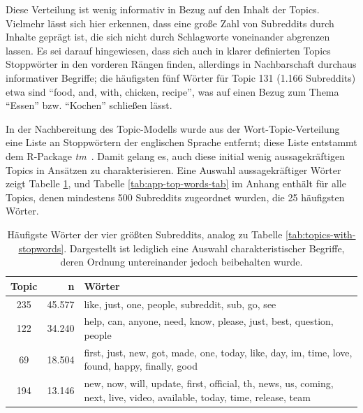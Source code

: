 \documentclass[11pt,a4paper,twoside]{article}
\begin{document}
Diese Verteilung ist wenig informativ in Bezug auf den Inhalt der
Topics. Vielmehr lässt sich hier erkennen, dass eine große Zahl von
Subreddits durch Inhalte geprägt ist, die sich nicht durch Schlagworte
voneinander abgrenzen lassen. Es sei darauf hingewiesen, dass sich auch
in klarer definierten Topics Stoppwörter in den vorderen Rängen finden,
allerdings in Nachbarschaft durchaus informativer Begriffe; die
häufigsten fünf Wörter für Topic 131 (1.166 Subreddits) etwa sind
\enquote{food, and, with, chicken, recipe}, was auf einen Bezug zum
Thema \enquote{Essen} bzw. \enquote{Kochen} schließen lässt.

In der Nachbereitung des Topic-Modells wurde aus der
Wort-Topic-Verteilung eine Liste an Stoppwörtern der englischen Sprache
entfernt; diese Liste entstammt dem R-Package \emph{tm}~\autocite{R-tm}.
Damit gelang es, auch diese initial wenig aussagekräftigen Topics in
Ansätzen zu charakterisieren. Eine Auswahl aussagekräftiger Wörter zeigt
Tabelle \ref{tab:topics-without-stopwords}, und Tabelle
\ref{tab:app-top-words-tab} im Anhang enthält für alle Topics, denen
mindestens 500 Subreddits zugeordnet wurden, die 25 häufigsten Wörter.






\begin{table}

\caption{\label{tab:topics-without-stopwords}Häufigste Wörter der vier größten
Subreddits, analog zu Tabelle \ref{tab:topics-with-stopwords}.
Dargestellt ist lediglich eine Auswahl charakteristischer Begriffe,
deren Ordnung untereinander jedoch beibehalten wurde.}
\centering
\begin{tabular}[t]{cr >{\raggedright\arraybackslash}p{}}
\toprule
Topic & n & Wörter\\
\midrule
235 & 45.577 & like, just, one, people, subreddit, sub, go, see\\
122 & 34.240 & help, can, anyone, need, know, please, just, best, question, people\\
69 & 18.504 & first, just, new, got, made, one, today, like, day, im, time, love, found, happy, finally, good\\
194 & 13.146 & new, now, will, update, first, official, th, news, us, coming, next, live, video, available, today, time, release, team\\
\bottomrule
\end{tabular}
\end{table}
\end{document}
